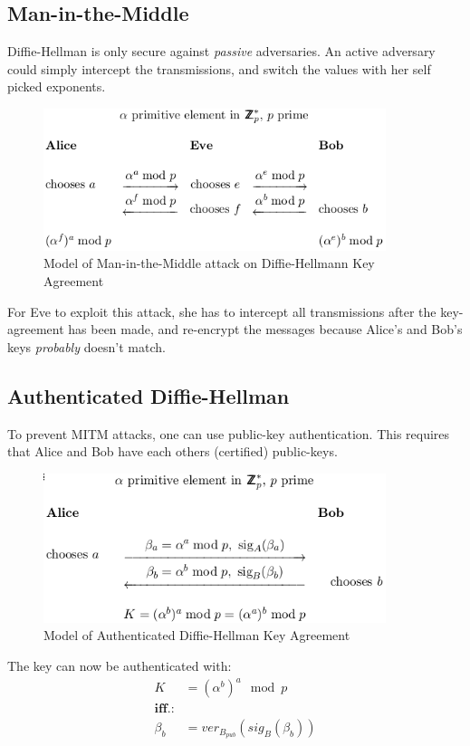 \subsection{Man-in-the-Middle}
Diffie-Hellman is only secure against \emph{passive} adversaries. An
active adversary could simply intercept the transmissions, and switch
the values with her self picked exponents.
\begin{figure}[H]
  \begin{centering}
    \includegraphics[width=10cm]{images/11-diffie-mitm}
    \caption{Model of Man-in-the-Middle attack on Diffie-Hellmann Key Agreement}
  \end{centering}
  \label{fig:diffie-mitm}
\end{figure}
For Eve to exploit this attack, she has to intercept all transmissions
after the key-agreement has been made, and re-encrypt the messages
because Alice's and Bob's keys \emph{probably} doesn't match.

\subsection{Authenticated Diffie-Hellman}
To prevent MITM attacks, one can use public-key authentication. This
requires that Alice and Bob have each others (certified) public-keys.
\begin{figure}[H]
  \begin{centering}
    \includegraphics[width=10cm]{images/11-auth-diffie}
    \caption{Model of Authenticated Diffie-Hellman Key Agreement}
  \end{centering}
  \label{fig:auth-diffie}
\end{figure}

The key can now be authenticated with:
\begin{align*}
  K &= (\alpha^b)^a \mod p \\
  \textbf{iff.:}& \\
  \beta_b &= ver_{B_{pub}}(sig_B(\beta_b))
\end{align*}